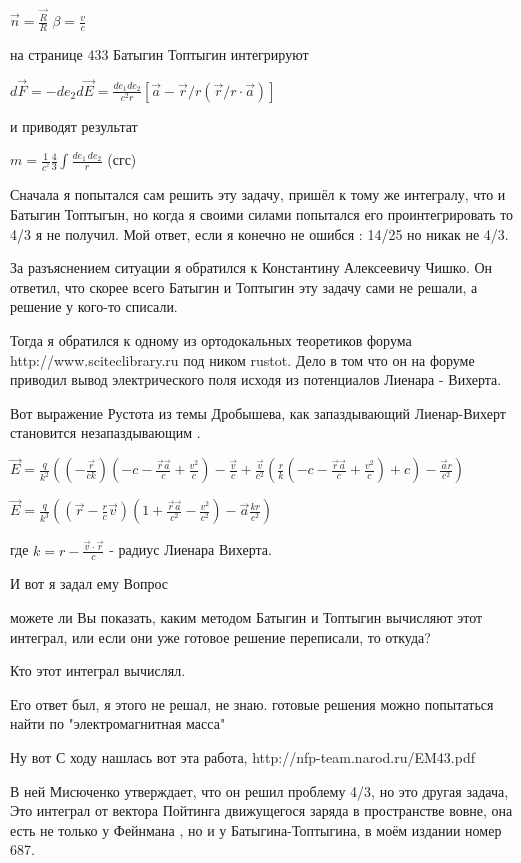 \documentclass{article}
\begin{document}
$\vec{n}=\frac{\vec{R}}{R}$ $\beta=\frac{v}{c}$

на странице 433 Батыгин Топтыгин интегрируют

$d\vec{F} = - d e_2 d\vec{E} = \frac{de_1 de_2}{c^2 r} \left[ \vec{a} - \vec{r}/r\left( \vec{r}/r \cdot \vec{a}\right) \right]$

и приводят результат 

$m =\frac{1}{{{c}^{^{2}}}}\frac{4}{3}\int\frac{de_1\,de_2}{r}$ (сгс)

Сначала я попытался сам решить эту задачу, пришёл к тому же интегралу, что и Батыгин Топтыгын, но когда я своими силами попытался его проинтегрировать то 4/3 я не получил. Мой ответ, если я конечно не ошибся : 14/25 но никак не 4/3. 

За разъяснением ситуации я обратился к Константину Алексеевичу Чишко. Он ответил, что скорее всего Батыгин и Топтыгин эту задачу сами не решали, а решение у кого-то списали. 


Тогда я обратился к одному из ортодокальных теоретиков форума 
http://www.sciteclibrary.ru 
под ником rustot. Дело в том что он на форуме приводил вывод электрического поля исходя из потенциалов Лиенара - Вихерта. 

Вот выражение Рустота из темы Дробышева, как запаздывающий Лиенар-Вихерт становится незапаздывающим \cite{rustot}.

$\vec{E} = \frac{q}{k^2}((-\frac{\vec{r}}{c k})(-c - \frac{\vec{r}\vec{a}}{c} + \frac{v^2}{c})-\frac{\vec{v}}{c}+\frac{\vec{v}}{c^2}(\frac{r}{k}(-c - \frac{\vec{r}\vec{a}}{c} + \frac{v^2}{c}) + c) - \frac{\vec{a}r}{c^2})$

$\vec{E} = \frac{q}{k^3}((\vec{r}-\frac{r}{c}\vec{v})(1 + \frac{\vec{r}\vec{a}}{c^2} - \frac{v^2}{c^2}) - \vec{a}\frac{kr}{c^2})$

где $k= r-\frac{\overrightarrow{v}\cdot \overrightarrow{r}}{c} $ - радиус Лиенара Вихерта.

И вот я задал ему Вопрос 

можете ли Вы показать, каким методом Батыгин и Топтыгин вычисляют этот интеграл, или если они уже готовое решение переписали, то откуда?

Кто этот интеграл вычислял.

Его ответ был, я этого не решал, не знаю. готовые решения можно попытаться найти по "электромагнитная масса"


Ну вот С ходу нашлась вот эта работа, http://nfp-team.narod.ru/EM43.pdf

В ней Мисюченко утверждает, что он решил проблему 4/3, но это другая задача, Это интеграл от вектора Пойтинга движущегося заряда в пространстве вовне, она есть не только у Фейнмана , но и у Батыгина-Топтыгина, в моём издании номер 687. 
\end{document}
